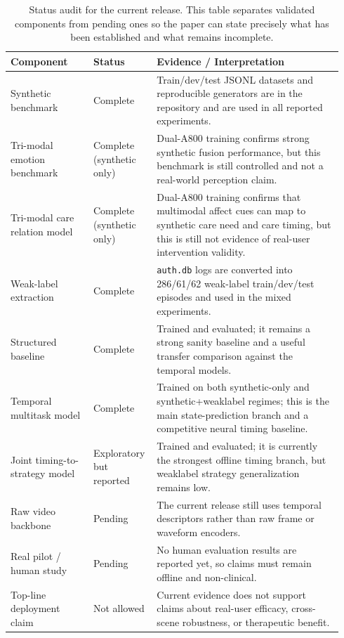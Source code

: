 \begin{table}[t]
\centering
\caption{Status audit for the current release. This table separates validated components from pending ones so the paper can state precisely what has been established and what remains incomplete.}
\label{tab:audit}
\small
\begin{tabular}{p{0.24\linewidth}p{0.16\linewidth}p{0.54\linewidth}}
\toprule
Component & Status & Evidence / Interpretation \\
\midrule
Synthetic benchmark & Complete & Train/dev/test JSONL datasets and reproducible generators are in the repository and are used in all reported experiments. \\
Tri-modal emotion benchmark & Complete (synthetic only) & Dual-A800 training confirms strong synthetic fusion performance, but this benchmark is still controlled and not a real-world perception claim. \\
Tri-modal care relation model & Complete (synthetic only) & Dual-A800 training confirms that multimodal affect cues can map to synthetic care need and care timing, but this is still not evidence of real-user intervention validity. \\
Weak-label extraction & Complete & \texttt{auth.db} logs are converted into 286/61/62 weak-label train/dev/test episodes and used in the mixed experiments. \\
Structured baseline & Complete & Trained and evaluated; it remains a strong sanity baseline and a useful transfer comparison against the temporal models. \\
Temporal multitask model & Complete & Trained on both synthetic-only and synthetic+weaklabel regimes; this is the main state-prediction branch and a competitive neural timing baseline. \\
Joint timing-to-strategy model & Exploratory but reported & Trained and evaluated; it is currently the strongest offline timing branch, but weaklabel strategy generalization remains low. \\
Raw video backbone & Pending & The current release still uses temporal descriptors rather than raw frame or waveform encoders. \\
Real pilot / human study & Pending & No human evaluation results are reported yet, so claims must remain offline and non-clinical. \\
Top-line deployment claim & Not allowed & Current evidence does not support claims about real-user efficacy, cross-scene robustness, or therapeutic benefit. \\
\bottomrule
\end{tabular}
\end{table}
